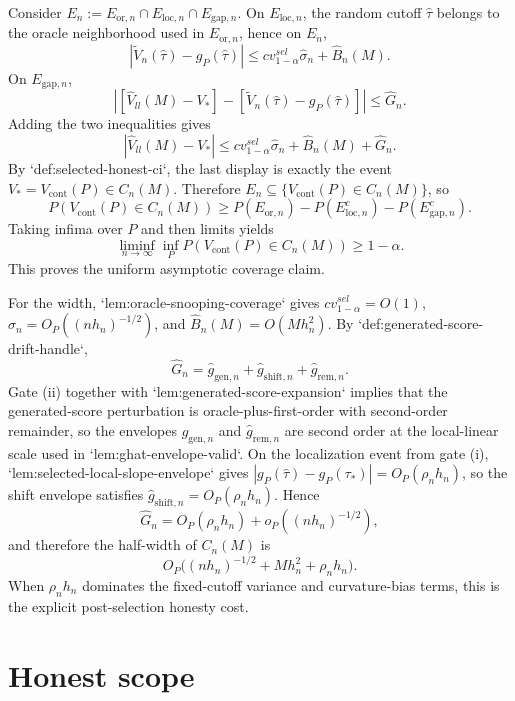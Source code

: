 \documentclass{article}
\begin{document}
Consider \(E_n:=E_{\mathrm{or},n}\cap E_{\mathrm{loc},n}\cap E_{\mathrm{gap},n}\). On \(E_{\mathrm{loc},n}\), the random cutoff \(\hat\tau\) belongs to the oracle neighborhood used in \(E_{\mathrm{or},n}\), hence on \(E_n\),
\[
|\tilde V_n(\hat\tau)-g_P(\hat\tau)|\le cv_{1-\alpha}^{sel}\hat\sigma_n+\hat B_n(M).
\]
On \(E_{\mathrm{gap},n}\),
\[
|[\hat V_{ll}(M)-V_*]-[\tilde V_n(\hat\tau)-g_P(\hat\tau)]|\le \hat G_n.
\]
Adding the two inequalities gives
\[
|\hat V_{ll}(M)-V_*|\le cv_{1-\alpha}^{sel}\hat\sigma_n+\hat B_n(M)+\hat G_n.
\]
By `def:selected-honest-ci`, the last display is exactly the event \(V_*=V_{\mathrm{cont}}(P)\in C_n(M)\). Therefore \(E_n\subseteq\{V_{\mathrm{cont}}(P)\in C_n(M)\}\), so
\[
P(V_{\mathrm{cont}}(P)\in C_n(M))\ge P(E_{\mathrm{or},n})-P(E_{\mathrm{loc},n}^c)-P(E_{\mathrm{gap},n}^c).
\]
Taking infima over \(P\) and then limits yields
\[
\liminf_{n\to\infty}\inf_P P(V_{\mathrm{cont}}(P)\in C_n(M))\ge 1-\alpha.
\]
This proves the uniform asymptotic coverage claim.

For the width, `lem:oracle-snooping-coverage` gives \(cv_{1-\alpha}^{sel}=O(1)\), \(\hat\sigma_n=O_P((n h_n)^{-1/2})\), and \(\hat B_n(M)=O(M h_n^2)\). By `def:generated-score-drift-handle`,
\[
\hat G_n=\hat g_{\mathrm{gen},n}+\hat g_{\mathrm{shift},n}+\hat g_{\mathrm{rem},n}.
\]
Gate (ii) together with `lem:generated-score-expansion` implies that the generated-score perturbation is oracle-plus-first-order with second-order remainder, so the envelopes \(\hat g_{\mathrm{gen},n}\) and \(\hat g_{\mathrm{rem},n}\) are second order at the local-linear scale used in `lem:ghat-envelope-valid`. On the localization event from gate (i), `lem:selected-local-slope-envelope` gives \(|g_P(\hat\tau)-g_P(\tau_*)|=O_P(\rho_n h_n)\), so the shift envelope satisfies \(\hat g_{\mathrm{shift},n}=O_P(\rho_n h_n)\). Hence
\[
\hat G_n=O_P(\rho_n h_n)+o_P((n h_n)^{-1/2}),
\]
and therefore the half-width of \(C_n(M)\) is
\[
O_P\bigl((n h_n)^{-1/2}+M h_n^2+\rho_n h_n\bigr).
\]
When \(\rho_n h_n\) dominates the fixed-cutoff variance and curvature-bias terms, this is the explicit post-selection honesty cost.

\section{Honest scope}
\end{document}
